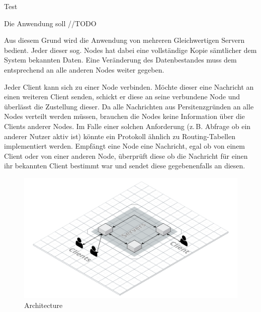 

Test

Die Anwendung soll //TODO

Aus diesem Grund wird die Anwendung von mehreren Gleichwertigen Servern bedient. Jeder dieser sog. Nodes hat dabei eine vollständige Kopie sämtlicher dem System bekannten Daten. Eine Veränderung des Datenbestandes muss dem entsprechend an alle anderen Nodes weiter gegeben.

Jeder Client kann sich zu einer Node verbinden. Möchte dieser eine Nachricht an einen weiteren Client senden, schickt er diese an seine verbundene Node und überlässt die Zustellung dieser. Da alle Nachrichten aus Persitenzgründen an alle Nodes verteilt werden müssen, brauchen die Nodes keine Information über die Clients anderer Nodes. Im Falle einer solchen Anforderung (z.\,B. Abfrage ob ein anderer Nutzer aktiv ist) könnte ein Protokoll ähnlich zu Routing-Tabellen implementiert werden. Empfängt eine Node eine Nachricht, egal ob von einem Client oder von einer anderen Node, überprüft diese ob die Nachricht für einen ihr bekannten Client bestimmt war und sendet diese gegebenenfalls an diesen.

\begin{figure}[h]
    \centering
    \includegraphics[width=\textwidth]{architecture.png}
    
    \caption{Architecture}
    \label{}
\end{figure}